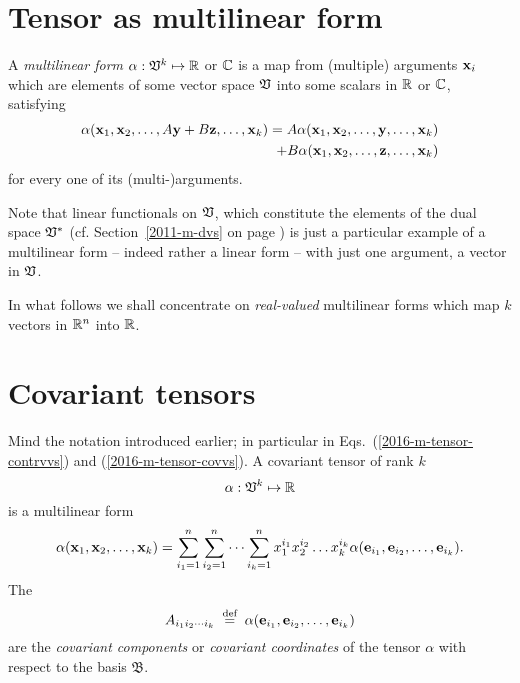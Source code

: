 \section{Tensor as multilinear form}

A {\em multilinear form}
$\alpha :{ \frak V }^k \mapsto {\Bbb R}$  or  ${\Bbb C}$
is a map from (multiple) arguments ${\bf x}_i$ which are elements of some vector space  $\frak V$
into some scalars in ${\Bbb R}$ or ${\Bbb C}$,  satisfying
\begin{equation}
\begin{split}
\alpha ( {\bf x}_1,{\bf x}_2,\ldots , A {\bf y}+ B {\bf z}, \ldots ,{\bf x}_k)
=
A\alpha ( {\bf x}_1,{\bf x}_2,\ldots , {\bf y}, \ldots ,{\bf x}_k)   \\
   \qquad +
B\alpha ( {\bf x}_1,{\bf x}_2,\ldots , {\bf z}, \ldots ,{\bf x}_k)
\end{split}
\end{equation}
for every one of its (multi-)arguments.

{
\color{blue}
Note that linear functionals on ${\frak V}$, which constitute the elements of the dual space ${\frak V}^\ast$
(cf. Section~\ref{2011-m-dvs} on page \pageref{2011-m-dvs}) is just a particular example of a  multilinear form
-- indeed rather a  linear form -- with just one argument, a vector in ${\frak V}$.
\eexample
}

In what follows we shall concentrate on {\em real-valued} multilinear forms which map
$k$ vectors in
${\Bbb R}^n$
into
${\Bbb R}$.



\section{Covariant tensors}


Mind the notation introduced earlier; in particular in Eqs.~(\ref{2016-m-tensor-contrvvs}) and (\ref{2016-m-tensor-covvs}).
A covariant tensor of rank $k$
\begin{equation}
\alpha:{ \frak V }^k \mapsto {\Bbb R}
\end{equation}
is a multilinear form
\begin{equation}
\alpha ( {\bf x}_1,{\bf x}_2,\ldots ,{\bf x}_k)=
\sum_{i_1=1}^n
\sum_{i_2=1}^n
\cdots
\sum_{i_k=1}^n
x^{i_1}_1 x^{i_2}_2\ldots x^{i_k}_k
\alpha ( {\bf e}_{i_1},{\bf e}_{i_2},\ldots ,{\bf e}_{i_k}).
\end{equation}
The
\begin{equation}
A_{{i_1}{i_2}\cdots {i_k}}
\stackrel{{\tiny \textrm{ def }}}{=}
\alpha ( {\bf e}_{i_1},{\bf e}_{i_2},\ldots ,{\bf e}_{i_k})
\end{equation}
 are the
{\em covariant components} or
{\em covariant coordinates}
of the tensor $\alpha $ with respect to the basis
${\mathfrak B}$.

